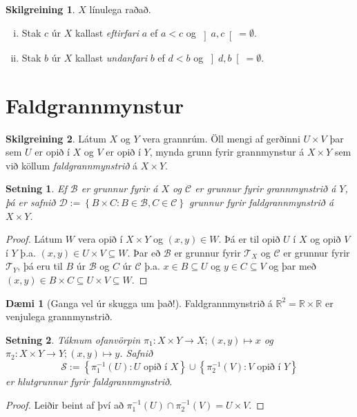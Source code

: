 \documentclass[a4paper,icelandic]{book}
\theoremstyle{definition}
\newtheorem{skilgr}{Skilgreining}[section]
\newtheorem{daemi}{Dæmi}[section]
\theoremstyle{plain}
\newtheorem{setn}{Setning}[section]
\theoremstyle{remark}
\newcommand{\R}{\mathbb{R}} %
\begin{document}
\begin{skilgr}
  $X$ línulega raðað. 
  \begin{enumerate}[(i)]
    \item Stak $c$ úr $X$ kallast \emph{eftirfari} $a$ ef $a <
      c$ og $\left] a,c \right[=\emptyset$.
    \item Stak $b$ úr $X$ kallast \emph{undanfari} $b$ ef $d<b$
      og $\left] d,b \right[ = \emptyset$. 
  \end{enumerate}
  \end{skilgr}

\section{Faldgrannmynstur}
\begin{skilgr}
  Látum $X$ og $Y$ vera grannrúm. Öll mengi af gerðinni $U\times V$ þar sem $U$
  er opið í $X$ og $V$ er opið í $Y$, mynda grunn fyrir grannmynstur á $X\times
  Y$ sem við köllum \emph{faldgrannmynstrið} á $X\times
  Y$.
\end{skilgr}
\begin{setn}
  Ef $\mathcal B$ er grunnur fyrir á $X$ og $\mathcal C$ er grunnur fyrir
  grannmynstrið á $Y$, þá er safnið $\mathcal D := \left\{ B\times C :
    B\in\mathcal B, C\in\mathcal C \right\}$ grunnur fyrir faldgrannmynstrið á
  $X\times Y$.
\end{setn}
\begin{proof}
  Látum $W$ vera opið í $X\times Y$ og $(x,y)\in W$. Þá er til opið $U$ í $X$ og
  opið $V$ í $Y$ þ.a. $(x,y)\in U\times V\subseteq W$. Þar eð $\mathcal B$ er
  grunnur fyrir $\mathcal T_X$ og $\mathcal C$ er grunnur fyrir $\mathcal T_Y$,
  þá eru til $B$ úr $\mathcal B$ og $C$ úr $\mathcal C$ þ.a. $x\in B\subseteq U$
  og $y\in C\subseteq V$ og þar með $(x,y)\in B\times C\subseteq U\times
  V\subseteq W$.
\end{proof}
\begin{daemi}
  [Ganga vel úr skugga um það!] Faldgrannmynstrið á $\R^2 = \R\times\R$ er
  venjulega grannmynstrið.
\end{daemi}
\begin{setn}
  Táknum ofanvörpin $\pi_1:X\times Y\to X;(x,y)\mapsto x$ og $\pi_2:X\times Y\to
  Y;(x,y)\mapsto y$. Safnið
  \[
  \mathcal S := \left\{ \pi_1^{-1}(U): U\text{ opið í } X \right\}\cup\left\{
    \pi_{2}^{-1}(V) : V\text{ opið í } Y \right\}
  \]
  er hlutgrunnur fyrir faldgrannmynstrið.
\end{setn}
\begin{proof}
  Leiðir beint af því að $\pi_1^{-1}(U)\cap\pi_2^{-1}(V) = U\times V$.
\end{proof}
\end{document}
